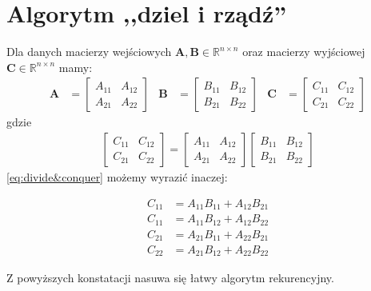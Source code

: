 \documentclass[a4paper,oneside,leqno,12pt]{book}
\theoremstyle{definition}
\theoremstyle{plain}
\theoremstyle{remark}
\begin{document}
\section{Algorytm ,,dziel i rządź''}
Dla danych macierzy wejściowych \(\mathbf{A}, \mathbf{B}\in\mathbb{R}^{n\times n}\) oraz macierzy wyjściowej \(\mathbf{C}\in\mathbb{R}^{n\times n}\) mamy:
\begin{align*}
\mathbf{A}& = \begin{bmatrix} A_{11}& A_{12} \\ A_{21}& A_{22} \end{bmatrix}&
\mathbf{B}& = \begin{bmatrix} B_{11}& B_{12} \\ B_{21}& B_{22} \end{bmatrix}&
\mathbf{C}& = \begin{bmatrix} C_{11}& C_{12} \\ C_{21}& C_{22} \end{bmatrix}
\end{align*}
gdzie
\begin{align}\label{eq:divide&conquer}
\begin{bmatrix} C_{11}& C_{12} \\ C_{21}& C_{22}\end{bmatrix}=
\begin{bmatrix} A_{11}& A_{12} \\ A_{21}& A_{22}\end{bmatrix}
\begin{bmatrix} B_{11}& B_{12} \\ B_{21}& B_{22}\end{bmatrix}
\end{align}
\eqref{eq:divide&conquer} możemy wyrazić inaczej:

\begin{equation}
\begin{split}
C_{11} &= A_{11}B_{11} + A_{12}B_{21}\\
C_{11} &= A_{11}B_{12} + A_{12}B_{22}\\
C_{21} &= A_{21}B_{11} + A_{22}B_{21}\\
C_{22} &= A_{21}B_{12} + A_{22}B_{22}
\end{split}
\end{equation}

Z powyższych konstatacji nasuwa się łatwy algorytm rekurencyjny.

\begin{algorithm}
\;
\end{algorithm}
\end{document}
